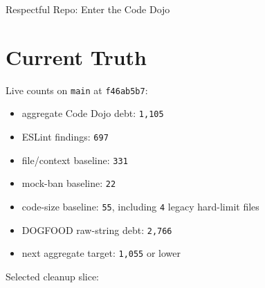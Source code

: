 \begin{CodeBlock}
Respectful Repo: Enter the Code Dojo
\end{CodeBlock}

\section{Current Truth}\label{record-234-current-truth}

Live counts on \texttt{m\allowbreak{}a\allowbreak{}i\allowbreak{}n} at \texttt{f\allowbreak{}4\allowbreak{}6\allowbreak{}a\allowbreak{}b\allowbreak{}5\allowbreak{}b\allowbreak{}7}:

\begin{itemize}
\tightlist
\item
  aggregate Code Dojo debt: \texttt{1\allowbreak{},\allowbreak{}1\allowbreak{}0\allowbreak{}5}
\item
  ESLint findings: \texttt{6\allowbreak{}9\allowbreak{}7}
\item
  file/context baseline: \texttt{3\allowbreak{}3\allowbreak{}1}
\item
  mock-ban baseline: \texttt{2\allowbreak{}2}
\item
  code-size baseline: \texttt{5\allowbreak{}5}, including \texttt{4} legacy hard-limit files
\item
  DOGFOOD raw-string debt: \texttt{2\allowbreak{},\allowbreak{}7\allowbreak{}6\allowbreak{}6}
\item
  next aggregate target: \texttt{1\allowbreak{},\allowbreak{}0\allowbreak{}5\allowbreak{}5} or lower
\end{itemize}

Selected cleanup slice:


